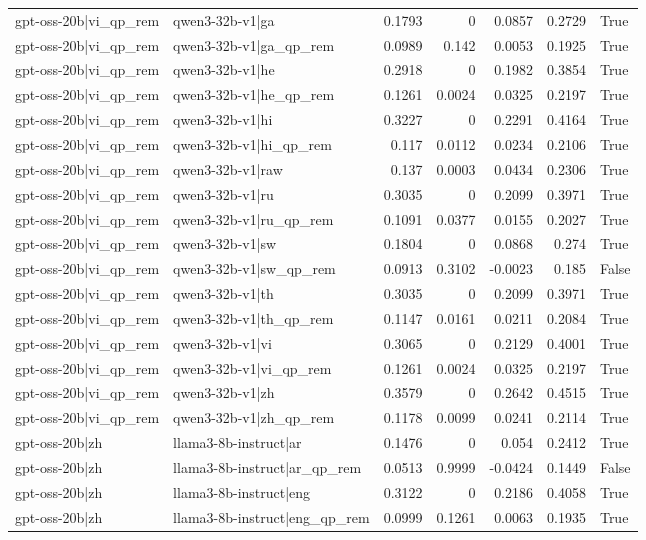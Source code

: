 \begin{table}
\begin{tabular}{l l r r r r l}
gpt-oss-20b|vi_qp_rem & qwen3-32b-v1|ga & 0.1793 & 0 & 0.0857 & 0.2729 & True \\
gpt-oss-20b|vi_qp_rem & qwen3-32b-v1|ga_qp_rem & 0.0989 & 0.142 & 0.0053 & 0.1925 & True \\
gpt-oss-20b|vi_qp_rem & qwen3-32b-v1|he & 0.2918 & 0 & 0.1982 & 0.3854 & True \\
gpt-oss-20b|vi_qp_rem & qwen3-32b-v1|he_qp_rem & 0.1261 & 0.0024 & 0.0325 & 0.2197 & True \\
gpt-oss-20b|vi_qp_rem & qwen3-32b-v1|hi & 0.3227 & 0 & 0.2291 & 0.4164 & True \\
gpt-oss-20b|vi_qp_rem & qwen3-32b-v1|hi_qp_rem & 0.117 & 0.0112 & 0.0234 & 0.2106 & True \\
gpt-oss-20b|vi_qp_rem & qwen3-32b-v1|raw & 0.137 & 0.0003 & 0.0434 & 0.2306 & True \\
gpt-oss-20b|vi_qp_rem & qwen3-32b-v1|ru & 0.3035 & 0 & 0.2099 & 0.3971 & True \\
gpt-oss-20b|vi_qp_rem & qwen3-32b-v1|ru_qp_rem & 0.1091 & 0.0377 & 0.0155 & 0.2027 & True \\
gpt-oss-20b|vi_qp_rem & qwen3-32b-v1|sw & 0.1804 & 0 & 0.0868 & 0.274 & True \\
gpt-oss-20b|vi_qp_rem & qwen3-32b-v1|sw_qp_rem & 0.0913 & 0.3102 & -0.0023 & 0.185 & False \\
gpt-oss-20b|vi_qp_rem & qwen3-32b-v1|th & 0.3035 & 0 & 0.2099 & 0.3971 & True \\
gpt-oss-20b|vi_qp_rem & qwen3-32b-v1|th_qp_rem & 0.1147 & 0.0161 & 0.0211 & 0.2084 & True \\
gpt-oss-20b|vi_qp_rem & qwen3-32b-v1|vi & 0.3065 & 0 & 0.2129 & 0.4001 & True \\
gpt-oss-20b|vi_qp_rem & qwen3-32b-v1|vi_qp_rem & 0.1261 & 0.0024 & 0.0325 & 0.2197 & True \\
gpt-oss-20b|vi_qp_rem & qwen3-32b-v1|zh & 0.3579 & 0 & 0.2642 & 0.4515 & True \\
gpt-oss-20b|vi_qp_rem & qwen3-32b-v1|zh_qp_rem & 0.1178 & 0.0099 & 0.0241 & 0.2114 & True \\
gpt-oss-20b|zh & llama3-8b-instruct|ar & 0.1476 & 0 & 0.054 & 0.2412 & True \\
gpt-oss-20b|zh & llama3-8b-instruct|ar_qp_rem & 0.0513 & 0.9999 & -0.0424 & 0.1449 & False \\
gpt-oss-20b|zh & llama3-8b-instruct|eng & 0.3122 & 0 & 0.2186 & 0.4058 & True \\
gpt-oss-20b|zh & llama3-8b-instruct|eng_qp_rem & 0.0999 & 0.1261 & 0.0063 & 0.1935 & True \\

\end{tabular}
\end{table}
